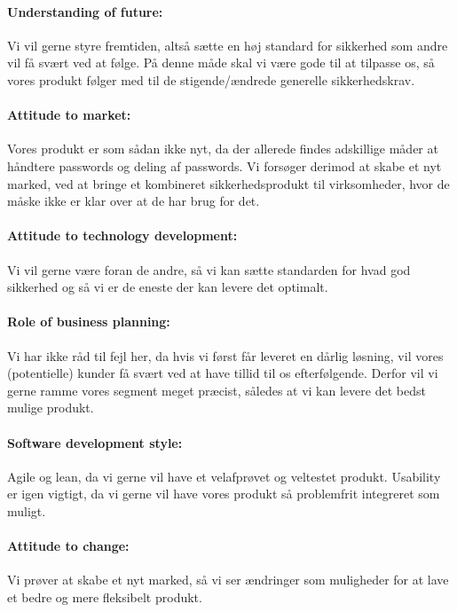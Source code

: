 \paragraph{Understanding of future:}
Vi vil gerne styre fremtiden, altså sætte en høj standard for sikkerhed som andre vil få svært ved at følge.
På denne måde skal vi være gode til at tilpasse os, så vores produkt følger med til de stigende/ændrede generelle sikkerhedskrav.

\paragraph{Attitude to market:} Vores produkt er som sådan ikke nyt, da der allerede findes adskillige måder at håndtere passwords og deling af passwords.
Vi forsøger derimod at skabe et nyt marked, ved at bringe et kombineret sikkerhedsprodukt til virksomheder, hvor de måske ikke er klar over at de har brug for det.

\paragraph{Attitude to technology development:}
Vi vil gerne være foran de andre, så vi kan sætte standarden for hvad god sikkerhed og så vi er de eneste der kan levere det optimalt.

\paragraph{Role of business planning:} Vi har ikke råd til fejl her, da hvis vi først får leveret en dårlig løsning, vil vores (potentielle) kunder få svært ved at have tillid til os efterfølgende.
Derfor vil vi gerne ramme vores segment meget præcist, således at vi kan levere det bedst mulige produkt.

\paragraph{Software development style:} Agile og lean, da vi gerne vil have et velafprøvet og veltestet produkt.
Usability er igen vigtigt, da vi gerne vil have vores produkt så problemfrit integreret som muligt.

\paragraph{Attitude to change:}
Vi prøver at skabe et nyt marked, så vi ser ændringer som muligheder for at lave et bedre og mere fleksibelt produkt.

